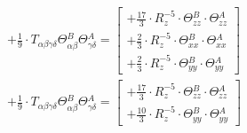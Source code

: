 \documentclass{article}
\begin{document}



\begin{subequations}\begin{gather}
\end{gather}\end{subequations}


\begin{subequations}\begin{gather}
+ \frac{1}{9} \cdot T_{\alpha{}\beta{}\gamma{}\delta{}} \Theta{}^{B}_{\alpha{}\beta{}} \Theta{}^{A}_{\gamma{}\delta{}} =  \left[ \begin{array}{c}
 		+ \frac{17}{3} \cdot R_{z}^{-5} \cdot \Theta{}^{B}_{zz} \cdot \Theta{}^{A}_{zz}
 \\[0.2em] 		 + \frac{2}{3} \cdot R_{z}^{-5} \cdot \Theta{}^{B}_{xx} \cdot \Theta{}^{A}_{xx}
 \\[0.2em] 		 + \frac{2}{3} \cdot R_{z}^{-5} \cdot \Theta{}^{B}_{yy} \cdot \Theta{}^{A}_{yy}
 \end{array}\right]  \\
+ \frac{1}{9} \cdot T_{\alpha{}\beta{}\gamma{}\delta{}} \Theta{}^{B}_{\alpha{}\beta{}} \Theta{}^{A}_{\gamma{}\delta{}} =  \left[ \begin{array}{c}
 		+ \frac{17}{3} \cdot R_{z}^{-5} \cdot \Theta{}^{B}_{zz} \cdot \Theta{}^{A}_{zz}
 \\[0.2em] 		 + \frac{10}{3} \cdot R_{z}^{-5} \cdot \Theta{}^{B}_{yy} \cdot \Theta{}^{A}_{yy}
 \end{array}\right]  \\
\end{gather}\end{subequations}
\end{document}
